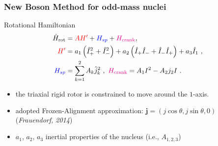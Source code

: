 \documentclass{beamer}
\begin{document}


\begin{frame}
	\frametitle{New Boson Method for odd-mass nuclei}
	\begin{exampleblock}{Rotational Hamiltonian}
		\begin{align}
			\hat{H}_\text{rot}&={\color{red}AH'}+{\color{blue}H_{sp}}+{\color{magenta}H_\text{crank}},\nonumber\\
			{\color{red}H'}&=a_1\left(\hat{I}_+^2+\hat{I}_-^2\right)+a_2\left(\hat{I}_+\hat{I}_-+\hat{I}_-\hat{I}_+\right)+a_3\hat{I}_1\ ,\nonumber\\
			{\color{blue}H_{sp}}&=\sum_{k=1}^2A_k\hat{j}_k^2\ ,\ {\color{magenta}H_\text{crank}}=A_1I^2-A_2j_2I\ .\nonumber
		\end{align}
	\end{exampleblock}
	\begin{itemize}
		\item the triaxial rigid rotor is constrained to move around the $1$-axis.
		\item adopted Frozen-Alignment approximation: $\mathbf{j}=(j\cos\theta,j\sin\theta,0)$ (\textit{Frauendorf, 2014})
		\item $a_1$, $a_2$, $a_3$ inertial properties of the nucleus (i.e., $A_{1,2,3}$)
	\end{itemize}
\end{frame}
\end{document}
